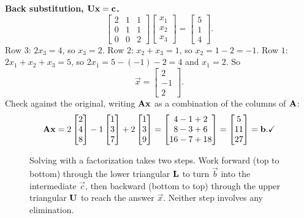 \textbf{Back substitution, $\mathbf{U}\mathbf{x}=\mathbf{c}$.}
\[
  \begin{bmatrix} 2 & 1 & 1 \\ 0 & 1 & 1 \\ 0 & 0 & 2 \end{bmatrix}
  \begin{bmatrix} x_1 \\ x_2 \\ x_3 \end{bmatrix}
  = \begin{bmatrix} 5 \\ 1 \\ 4 \end{bmatrix}.
\]
Row $3$: $2x_3 = 4$, so $x_3 = 2$. Row $2$: $x_2 + x_3 = 1$, so $x_2 = 1 - 2 = -1$.
Row $1$: $2x_1 + x_2 + x_3 = 5$, so $2x_1 = 5 - (-1) - 2 = 4$ and $x_1 = 2$. So
\[
  \vec{x} = \begin{bmatrix} 2 \\ -1 \\ 2 \end{bmatrix}.
\]
Check against the original, writing $\mathbf{A}\mathbf{x}$ as a combination of the columns of
$\mathbf{A}$:
\[
  \mathbf{A}\mathbf{x} = 2\begin{bmatrix}2\\4\\8\end{bmatrix} - 1\begin{bmatrix}1\\3\\7\end{bmatrix} + 2\begin{bmatrix}1\\3\\9\end{bmatrix}
  = \begin{bmatrix}4-1+2 \\ 8-3+6 \\ 16-7+18\end{bmatrix} = \begin{bmatrix}5\\11\\27\end{bmatrix} = \mathbf{b}. \checkmark
\]

\begin{figure}[H]
\centering
{}
\caption{Solving with a factorization takes two steps. Work forward (top to bottom) through
the lower triangular $\mathbf{L}$ to turn $\vec{b}$ into the intermediate $\vec{c}$, then
backward (bottom to top) through the upper triangular $\mathbf{U}$ to reach the answer
$\vec{x}$. Neither step involves any elimination.}
\label{ch09:fig-twoslides}
\end{figure}

